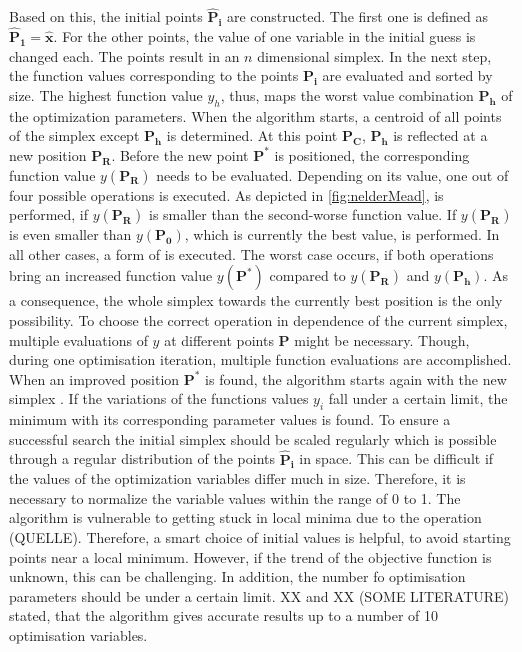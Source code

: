 Based on this, the initial points $\mathbf{\hat{P}_i}$ are constructed. The first one is defined as $\mathbf{\hat{P}_1} = \mathbf{\hat{x}}$. For the other points, the value of one variable in the initial guess is changed each. The points result in an $n$ dimensional simplex. In the next step, the function values corresponding to the points $\mathbf{P_i}$ are evaluated and sorted by size. The highest function value $y_h$, thus, maps the worst value combination $\mathbf{P_h}$ of the optimization parameters. When the algorithm starts, a centroid of all points of the simplex except $\mathbf{P_h}$ is determined. At this point $\mathbf{P_C}$, $\mathbf{P_h}$ is reflected at a new position $\mathbf{P_R}$. Before the new point $\mathbf{P^{*}}$ is positioned, the corresponding function value $y(\mathbf{P_R})$ needs to be evaluated. Depending on its value, one out of four possible operations is executed. As depicted in \autoref{fig:nelderMead},  is performed, if $y(\mathbf{P_R})$ is smaller than the second-worse function value. If $y(\mathbf{P_R})$ is even smaller than $y(\mathbf{P_0})$, which is currently the best value,  is performed. In all other cases, a form of  is executed. The worst case occurs, if both  operations bring an increased function value $y(\mathbf{P^*})$ compared to $y(\mathbf{P_R})$ and $y(\mathbf{P_h})$. As a consequence,  the whole simplex towards the currently best position is the only possibility. To choose the correct operation in dependence of the current simplex, multiple evaluations of $y$ at different points $\mathbf{P}$ might be necessary. Though, during one optimisation iteration, multiple function evaluations are accomplished. When an improved position $\mathbf{P^{*}}$ is found, the algorithm starts again with the new simplex \cite{nelder_simplex_1965}. If the variations of the functions values $y_i$ fall under a certain limit, the minimum with its corresponding parameter values is found. To ensure a successful search the initial simplex should be scaled regularly \cite{baudin_nelder-mead_nodate} which is possible through a regular distribution of the points $\mathbf{\hat{P}_i}$ in space. This can be difficult if the values of the optimization variables differ much in size. Therefore, it is necessary to normalize the variable values within the range of 0 to 1. The algorithm is vulnerable to getting stuck in local minima due to the  operation (QUELLE). Therefore, a smart choice of initial values is helpful, to avoid starting points near a local minimum. However, if the trend of the objective function is unknown, this can be challenging. In addition, the number fo optimisation parameters should be under a certain limit. XX and XX (SOME LITERATURE) stated, that the algorithm gives accurate results up to a number of 10 optimisation variables.




